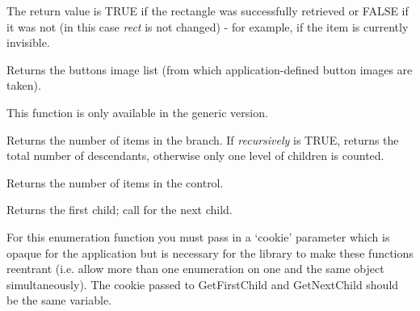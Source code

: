The return value is TRUE if the rectangle was successfully retrieved or FALSE
if it was not (in this case {\it rect} is not changed) - for example, if the
item is currently invisible.



\label{wxtreelistctrlgetbuttonsimagelist}


Returns the buttons image list (from which application-defined button images are taken).

This function is only available in the generic version.

\label{wxtreelistctrlgetchildrencount}


Returns the number of items in the branch. If {\it recursively} is TRUE, returns the total number
of descendants, otherwise only one level of children is counted.

\label{wxtreelistctrlgetcount}


Returns the number of items in the control.

\label{wxtreelistctrlgetfirstchild}


Returns the first child; call  for the next child.

For this enumeration function you must pass in a `cookie' parameter
which is opaque for the application but is necessary for the library
to make these functions reentrant (i.e. allow more than one
enumeration on one and the same object simultaneously). The cookie passed to
GetFirstChild and GetNextChild should be the same variable.

